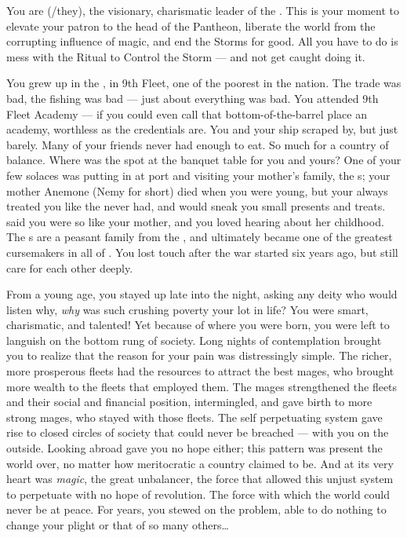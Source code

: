 \documentclass[char]{GL2020}
\begin{document}
\name{\cChupLeader{}}

You are \cChupLeader{\full} (\cChupLeader{\they}/they), the visionary, charismatic leader of the \pGoaties{}. This is your moment to elevate your patron \cGenesis{\Deity} \cGenesis{} to the head of the Pantheon, liberate the world from the corrupting influence of magic, and end the Storms for good. All you have to do is mess with the Ritual to Control the Storm — and not get caught doing it.

You grew up in the \pShip{}, in 9th Fleet, one of the poorest in the nation. The trade was bad, the fishing was bad — just about everything was bad. You attended 9th Fleet Academy — if you could even call that bottom-of-the-barrel place an academy, worthless as the credentials are. You and your ship scraped by, but just barely. Many of your friends never had enough to eat. So much for a country of balance. Where was the spot at the banquet table for you and yours? One of your few solaces was putting in at port and visiting your mother’s family, the \cCurse{\formal}s; your mother Anemone (Nemy for short) died when you were young, but your \cCurse{\auncle} \cCurse{\full} always treated you like the \cChupLeader{\offspring} \cCurse{\they} never had, and would sneak you small presents and treats. \cCurse{\They} said you were so like your mother, and you loved hearing about her childhood. The \cCurse{\formal}s are a peasant family from the \pFarm{}, and \cCurse{} ultimately became one of the greatest cursemakers in all of \pEarth{}. You lost touch after the war started six years ago, but still care for each other deeply.

From a young age, you stayed up late into the night, asking any deity who would listen why, \emph{why} was such crushing poverty your lot in life? You were smart, charismatic, and talented! Yet because of where you were born, you were left to languish on the bottom rung of society. Long nights of contemplation brought you to realize that the reason for your pain was distressingly simple. The richer, more prosperous fleets had the resources to attract the best mages, who brought more wealth to the fleets that employed them. The mages strengthened the fleets and their social and financial position, intermingled, and gave birth to more strong mages, who stayed with those fleets. The self perpetuating system gave rise to closed circles of society that could never be breached — with you on the outside. Looking abroad gave you no hope either; this pattern was present the world over, no matter how meritocratic a country claimed to be. And at its very heart was \emph{magic}, the great unbalancer, the force that allowed this unjust system to perpetuate with no hope of revolution. The force with which the world could never be at peace. For years, you stewed on the problem, able to do nothing to change your plight or that of so many others\ldots{}
\end{document}

